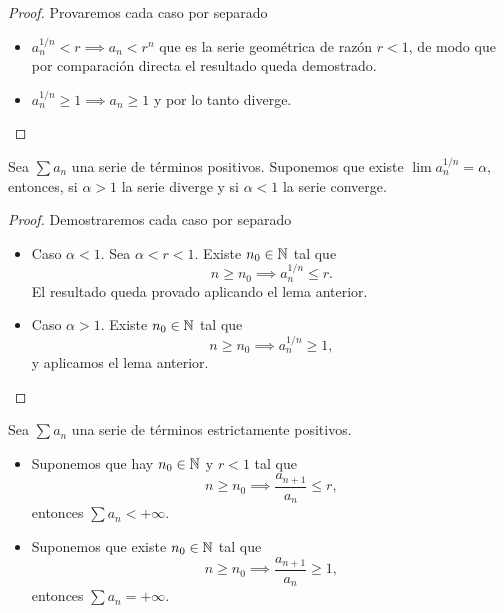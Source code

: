 \begin{proof}
    Provaremos cada caso por separado
    \begin{itemize}
        \item $a_n^{1/n} < r \implies a_n < r^n$ que es la serie geométrica de
        razón $r < 1$, de modo que por comparación directa el resultado queda
        demostrado.
        \item $a_n^{1/n} \geq 1 \implies a_n \geq 1$ y por lo tanto diverge.
    \end{itemize}
\end{proof}

\begin{prop}
    Sea $\sum a_n$ una serie de términos positivos. Suponemos que existe
    $\lim a_n^{1/n} = \alpha$, entonces, si $\alpha > 1$ la serie diverge y si
    $\alpha < 1$ la serie converge.
\end{prop}

\begin{proof}
    Demostraremos cada caso por separado
    \begin{itemize}
        \item Caso $\alpha < 1$. Sea $\alpha < r < 1$. Existe $n_0 \in \mathbb{N}$ tal que
        \[
            n \geq n_0 \implies a_n^{1/n} \leq r.
        \]
        El resultado queda provado aplicando el lema anterior.
        \item Caso $\alpha > 1$. Existe $n_0 \in \mathbb{N}$ tal que
        \[
            n \geq n_0 \implies a_n^{1/n} \geq 1,
        \]
        y aplicamos el lema anterior.
    \end{itemize}
\end{proof}

\begin{lema}
    Sea $\sum a_n$ una serie de términos estrictamente positivos.
    \begin{itemize}
        \item Suponemos que hay $n_0 \in \mathbb{N}$ y $r < 1$ tal que
        \[
            n \geq n_0 \implies \frac{a_{n+1}}{a_n} \leq r,
        \]
        entonces $\sum a_n < + \infty$.
        \item Suponemos que existe $n_0 \in \mathbb{N}$ tal que
        \[
            n \geq n_0 \implies \frac{a_{n+1}}{a_n} \geq 1,
        \]
        entonces $\sum a_n = + \infty$.
    \end{itemize}
\end{lema}

